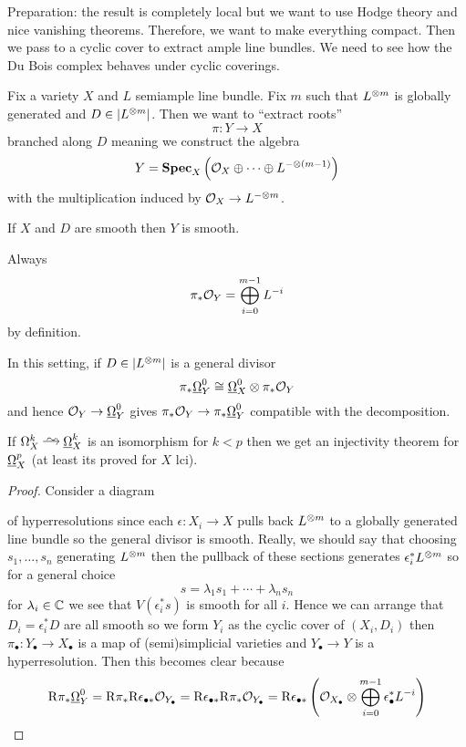 \documentclass[12pt]{article}
\newcommand{\R}{\mathrm{R}}
\begin{document}
Preparation: the result is completely local but we want to use Hodge theory and nice vanishing theorems. Therefore, we want to make everything compact. Then we pass to a cyclic cover to extract ample line bundles. We need to see how the Du Bois complex behaves under cyclic coverings.
\par 
Fix a variety $X$ and $L$ semiample line bundle. Fix $m$ such that $L^{\otimes m}$ is globally generated and $D \in |L^{\otimes m}|$. Then we want to ``extract roots''
\[ \pi : Y \to X \]
branched along $D$ meaning we construct the algebra
\[ Y = \mathbf{Spec}_{X}\left( \mathcal{O}_{X} \oplus \cdots \oplus L^{-\otimes (m-1)} \right) \]
with the multiplication induced by $\mathcal{O}_{X} \to L^{-\otimes m}$. 

\begin{rmk}
If $X$ and $D$ are smooth then $Y$ is smooth.
\end{rmk}

Always
\[ \pi_* \mathcal{O}_{Y} = \bigoplus_{i = 0}^{m - 1} L^{-i} \]
by definition. 

\begin{lemma}
In this setting, if $D \in |L^{\otimes m}|$ is a general divisor 
\[ \pi_* \underline{\Omega}_Y^0 \cong \underline{\Omega}_X^0 \otimes \pi_* \mathcal{O}_{Y} \]
and hence $\mathcal{O}_{Y} \to \underline{\Omega}_Y^0$ gives $\pi_* \mathcal{O}_{Y} \to \pi_* \underline{\Omega}_Y^0$ compatible with the decomposition. 
\end{lemma}

\begin{rmk}
If $\Omega_X^k \iso \ul{\Omega}_X^k$ is an isomorphism for $k < p$ then we get an injectivity theorem for $\underline{\Omega}_X^p$ (at least its proved for $X$ lci). 
\end{rmk}

\begin{proof}
Consider a diagram
\begin{center}
\end{center}
of hyperresolutions since each $\epsilon : X_i \to X$ pulls back $L^{\otimes m}$ to a globally generated line bundle so the general divisor is smooth. Really, we should say that choosing $s_1, \dots, s_n$ generating $L^{\otimes m}$ then the pullback of these sections generates $\epsilon^*_i L^{\otimes m}$ so for a general choice 
\[ s = \lambda_1 s_1 + \cdots + \lambda_n s_n \]
for $\lambda_i \in \mathbb{C}$ we see that $V(\epsilon_i^* s)$ is smooth for all $i$.
Hence we can arrange that $D_i = \epsilon_i^* D$ are all smooth so we form $Y_i$ as the cyclic cover of $(X_i, D_i)$ then $\pi_\bullet : Y_\bullet \to X_\bullet$ is a map of (semi)simplicial varieties and $Y_\bullet \to Y$ is a hyperresolution. Then this becomes clear because
\[ \R \pi_* \ul{\Omega}_Y^0 = \R \pi_* \R \epsilon_{\bullet *} \struct{Y_\bullet} = \R \epsilon_{\bullet *} \R \pi_* \struct{Y_\bullet} = \R \epsilon_{\bullet *} \left(\struct{X_\bullet} \ot \bigoplus_{i = 0}^{m-1} \epsilon_\bullet^* L^{-i} \right) \]
\end{proof}
\end{document}
